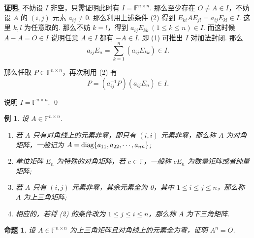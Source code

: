 \documentclass[10pt,openany]{article}
\theoremstyle{thmstyle} %
\theoremstyle{defstyle} %
\theoremstyle{prostyle} %
\newtheorem{proposition}[theorem]{命题}
\theoremstyle{exastyle}
\newtheorem{example}[theorem]{例}
\theoremstyle{remstyle}
\renewenvironment{proof}[1][证明]{\par\underline{\textbf{#1.}} \;\fangsong}{\qed\par}
\newcommand{\F}{\mathbb{F}}
\begin{document}
\begin{proof}
	不妨设 \( I \) 非空，只需证明此时有 \( I=\F^{n \times n} \). 那么至少存在 \( O \neq A \in I \)，不妨设 \( A \) 的 \( (i,j)\) 元素 \( a_{ij} \neq 0 \). 那么利用上述条件 (2) 得到 \( E_{ki}AE_{jl}=a_{ij}E_{kl} \in I \). 这里 \( k,l \) 为任意取的. 那么不妨 \( k=l \)，得到 \( a_{ij}E_{kk} \ (1 \leq k \leq n) \in I \). 而这时候 \( A-A=O \in I \) 说明任意 \( A \in I  \) 都有 \( -A \in I \). 即 (1) 可推出 \( I \) 对加法封闭. 那么
	\[ a_{ij}E_n=\sum_{k=1}^{n} (a_{ij}E_{kk}) \in I. \]
	
	那么任取 \( P \in \F^{n \times n} \)，再次利用 (2) 有 
	\[ P= (a_{ij}^{-1}P)(a_{ij}E_n) \in I. \]
	
	说明 \( I=\F^{n \times n} \).
\end{proof}

\begin{example}
	设 \( A \in \F^{n \times n} \).
	\begin{enumerate}[(1)]
		\item 若 \( A \) 只有对角线上的元素非零，即只有 \( (i,i) \) 元素非零，那么称 \( A \) 为对角矩阵，一般记为 \( A=\mathrm{diag}\{a_{11},a_{22},\cdots \\ ,a_{nn} \} \);
		\item 单位矩阵 \( E_n \) 为特殊的对角矩阵，若 \( c \in \F \)，一般称 \( cE_n \) 为数量矩阵或者纯量矩阵;
		\item 若 \( A \) 只有 \( (i,j) \) 元素非零，其余元素全为 0，其中 \( 1 \leq i \leq j \leq n \)，那么称 \( A \) 为上三角矩阵;
		\item 相应的，若将 (2) 的条件改为 \( 1 \leq j \leq i \leq n \)，那么称 \( A \) 为下三角矩阵.
	\end{enumerate}
\end{example}

\begin{proposition}	\label{1.3.19}
	设 \( A \in \F^{n \times n} \) 为上三角矩阵且对角线上的元素全为零，证明 \( A^n=O \).

\end{proposition}
\end{document}
